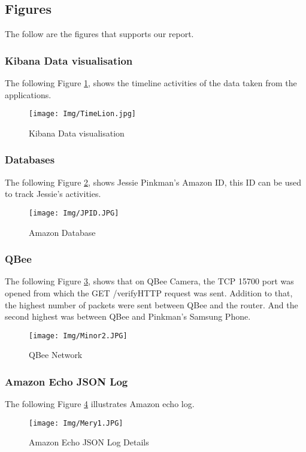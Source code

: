 \documentclass{easychair}
\begin{document}
\subsection{Figures}
The follow are the figures that supports our report.
\subsubsection{Kibana Data visualisation}
The following Figure \ref{fig:Kibana Data visualisation}, shows the timeline activities of the data taken from the applications.
\begin{figure}[h]
    \centering
    \texttt{[image: Img/TimeLion.jpg]}
    \caption{Kibana Data visualisation}
    \label{fig:Kibana Data visualisation}
\end{figure}
\subsubsection{Databases}
The following Figure \ref{fig:Amazon Database}, shows Jessie Pinkman's Amazon ID, this ID can be used to track Jessie's activities.
\begin{figure}[h]
    \centering
    \texttt{[image: Img/JPID.JPG]}
    \caption{Amazon Database}
    \label{fig:Amazon Database}
\end{figure}
\newpage
\subsubsection{QBee}
The following Figure \ref{fig:QBee Network}, shows that on QBee Camera, the TCP 15700 port was opened from which the GET /verifyHTTP request was sent. Addition to that, the highest number of packets were sent between QBee and the router. And the second highest was between QBee and Pinkman’s Samsung Phone.
\begin{figure}[h]
    \centering
    \texttt{[image: Img/Minor2.JPG]}
    \caption{QBee Network}
    \label{fig:QBee Network}
\end{figure}
\newpage
\subsubsection{Amazon Echo JSON Log}
The following Figure \ref{fig:Amazon Echo JSON Log Details} illustrates Amazon echo log.
\begin{figure}[h]
    \centering
    \texttt{[image: Img/Mery1.JPG]}
    \caption{Amazon Echo JSON Log Details}
    \label{fig:Amazon Echo JSON Log Details}
\end{figure}
\newpage
\end{document}
